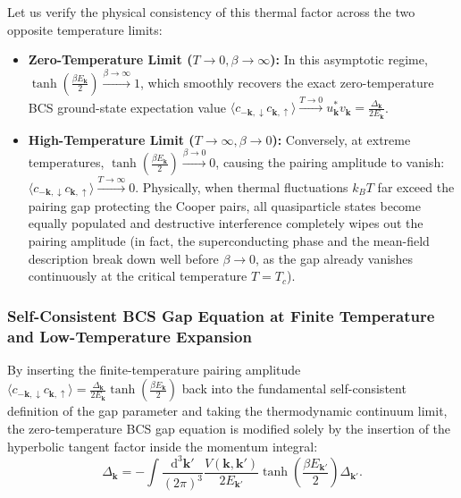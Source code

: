 Let us verify the physical consistency of this thermal factor across the two opposite temperature limits:
\begin{itemize}
    \item \textbf{Zero-Temperature Limit (\( T \to 0, \beta \to \infty \)):} In this asymptotic regime, \( \tanh\left(\frac{\beta E_{\mathbf{k}}}{2}\right) \xrightarrow{\beta \to \infty} 1 \), which smoothly recovers the exact zero-temperature BCS ground-state expectation value \( \langle c_{-\mathbf{k},\downarrow} c_{\mathbf{k},\uparrow} \rangle \xrightarrow{T \to 0} u_{\mathbf{k}}^* v_{\mathbf{k}} = \frac{\Delta_{\mathbf{k}}}{2E_{\mathbf{k}}} \).
    \item \textbf{High-Temperature Limit (\( T \to \infty, \beta \to 0 \)):} Conversely, at extreme temperatures, \( \tanh\left(\frac{\beta E_{\mathbf{k}}}{2}\right) \xrightarrow{\beta \to 0} 0 \), causing the pairing amplitude to vanish: \( \langle c_{-\mathbf{k},\downarrow} c_{\mathbf{k},\uparrow} \rangle \xrightarrow{T \to \infty} 0 \). Physically, when thermal fluctuations \( k_B T \) far exceed the pairing gap protecting the Cooper pairs, all quasiparticle states become equally populated and destructive interference completely wipes out the pairing amplitude (in fact, the superconducting phase and the mean-field description break down well before \( \beta \to 0 \), as the gap already vanishes continuously at the critical temperature \( T = T_c \)).
\end{itemize}

\subsubsection{Self-Consistent BCS Gap Equation at Finite Temperature and Low-Temperature Expansion}

By inserting the finite-temperature pairing amplitude \( \langle c_{-\mathbf{k},\downarrow} c_{\mathbf{k},\uparrow} \rangle = \frac{\Delta_{\mathbf{k}}}{2E_{\mathbf{k}}} \tanh\left(\frac{\beta E_{\mathbf{k}}}{2}\right) \) back into the fundamental self-consistent definition of the gap parameter and taking the thermodynamic continuum limit, the zero-temperature BCS gap equation is modified solely by the insertion of the hyperbolic tangent factor inside the momentum integral:
\begin{equation} \label{eq:finite_t_gap_equation}
    \Delta_{\mathbf{k}} = -\int \frac{\mathrm{d}^3\mathbf{k}'}{(2\pi)^3} \frac{V(\mathbf{k}, \mathbf{k}')}{2E_{\mathbf{k}'}} \tanh\left(\frac{\beta E_{\mathbf{k}'}}{2}\right) \Delta_{\mathbf{k}'}.
\end{equation}

